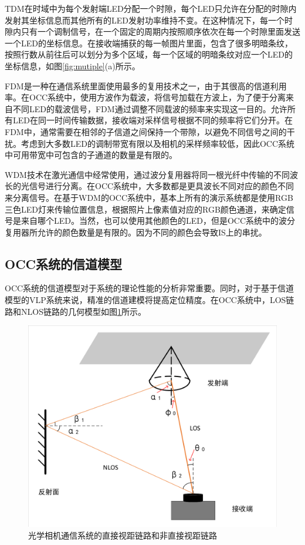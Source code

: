 TDM在时域中为每个发射端LED分配一个时隙，每个LED只允许在分配的时隙内发射其坐标信息而其他所有的LED发射功率维持不变。在这种情况下，每一个时隙内只有一个调制信号，在一个固定的周期内按照顺序依次在每一个时隙里面发送一个LED的坐标信息。在接收端捕获的每一帧图片里面，包含了很多明暗条纹，按照行数从前往后可以划分为多个区域，每一个区域的明暗条纹对应一个LED的坐标信息，如图\ref{fig:mutiple}(a)所示。

FDM是一种在通信系统里面使用最多的复用技术之一，由于其很高的信道利用率。在OCC系统中，使用方波作为载波，将信号加载在方波上，为了便于分离来自不同LED的载波信号，FDM通过调整不同载波的频率来实现这一目的。允许所有LED在同一时间传输数据，接收端对采样信号根据不同的频率将它们分开。在FDM中，通常需要在相邻的子信道之间保持一个带隙，以避免不同信号之间的干扰。考虑到大多数LED的调制带宽有限以及相机的采样频率较低，因此OCC系统中可用带宽中可包含的子通道的数量是有限的。

WDM技术在激光通信中经常使用，通过波分复用器将同一根光纤中传输的不同波长的光信号进行分离。在OCC系统中，大多数都是更具波长不同对应的颜色不同来分离信号。在基于WDM的OCC系统中，基本上所有的演示系统都是使用RGB三色LED灯来传输位置信息，根据照片上像素值对应的RGB颜色通道，来确定信号是来自哪个LED。当然，也可以使用其他颜色的LED，但是OCC系统中的波分复用器所允许的颜色数量是有限的。因为不同的颜色会导致IS上的串扰。



\subsection{OCC系统的信道模型}
OCC系统的信道模型对于系统的理论性能的分析非常重要。同时，对于基于信道模型的VLP系统来说，精准的信道建模将提高定位精度。在OCC系统中，LOS链路和NLOS链路的几何模型如图\ref{fig:channel model}所示。

\begin{figure}[!t]
  \centering
  \includegraphics[width=0.85\linewidth]{FIG/channel-model.pdf}
  \caption{光学相机通信系统的直接视距链路和非直接视距链路}
  \label{fig:channel model}
\end{figure}


